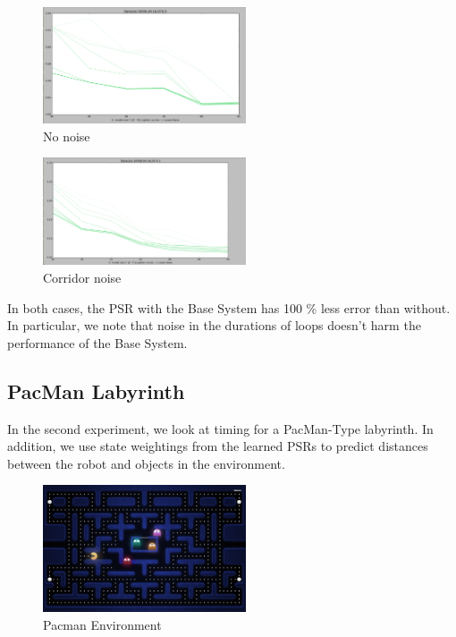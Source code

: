 \documentclass{acm_proc_article-sp}
\begin{document}
\begin{figure}[ht!]
\centering
\includegraphics[width=60mm]{lucasplots/doubleloop0.png}
\caption{No noise \label{overflow}}
\end{figure}

\begin{figure}[ht!]
\centering
\includegraphics[width=60mm]{lucasplots/doubleloop0_1.png}
\caption{Corridor noise \label{overflow}}
\end{figure}

In both cases, the PSR with the Base System has 100 \% less error than without. In particular, we note that noise in the durations of loops doesn't harm the performance of the Base System.

\subsection{PacMan Labyrinth}

In the second experiment, we look at timing for a PacMan-Type labyrinth. In addition, we use state weightings from the learned PSRs to predict distances between the robot and objects in the environment. 

\begin{figure}[ht!]
\centering
\includegraphics[width=60mm]{lucasplots/pac-man.jpg}
\caption{Pacman Environment \label{overflow}}
\end{figure}
\end{document}
